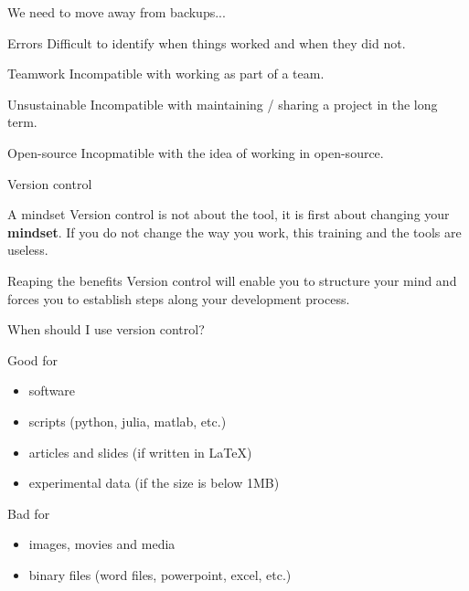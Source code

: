 \documentclass[c,11pt,xcolor=dvipsnames, aspectratio=169]{beamer}
\begin{document}
\begin{frame} {We need to move away from backups...}
\begin{block}{Errors}
Difficult to identify when things worked and when they did not.
\end{block}

\begin{block}{Teamwork}
Incompatible with working as part of a team. 
\end{block}

\begin{block}{Unsustainable}
Incompatible with maintaining / sharing a project in the long term.
\end{block}

\begin{block}{Open-source}
	Incopmatible with the idea of working in open-source.
\end{block}
\end{frame}


\begin{frame} {Version control}
\begin{block}{A mindset}
Version control is not about the tool, it is first about changing your \textbf{mindset}. If you do not change the way you work, this training and the tools are useless.
\end{block}


{
\begin{block}{Reaping the benefits}
Version control will enable you to structure your mind and forces you to establish steps along your development process.
\end{block}
}
\end{frame}


\begin{frame} {When should I use version control?}

\begin{block}{Good for}
\begin{itemize}
\item software
\item scripts (python, julia, matlab, etc.)
\item articles and slides (if written in \LaTeX)
\item experimental data (if the size is below 1MB)
\end{itemize}
\end{block}
	
\begin{block}{Bad for}
\begin{itemize}
\item images, movies and media
\item binary files (word files, powerpoint, excel, etc.)
\end{itemize}
\end{block}
\end{frame}
\end{document}
